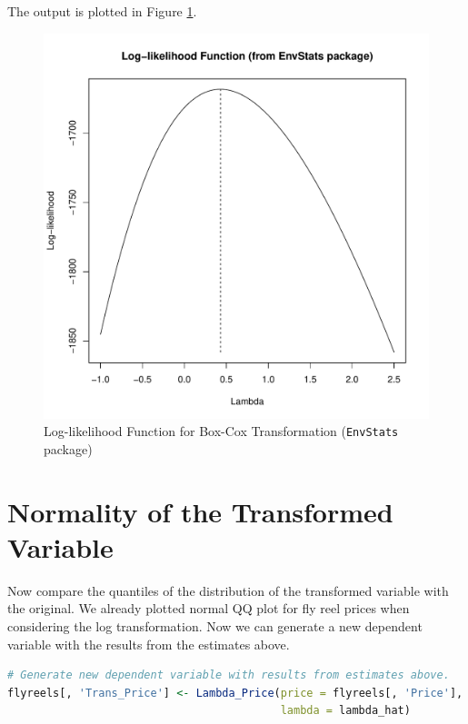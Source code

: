 \documentclass[11pt]{book}
\begin{document}
The output is plotted in Figure \ref{fig:plot_like_EnvStats}.

\begin{figure}[h!]
  \centering
  \includegraphics[scale = 0.5, keepaspectratio=true]{../Figures/plot_like_EnvStats}
  \caption{Log-likelihood Function for Box-Cox Transformation (\texttt{EnvStats} package)} \label{fig:plot_like_EnvStats}
\end{figure}






\clearpage
\section*{Normality of the Transformed Variable}

Now compare the quantiles of the distribution of the transformed variable with 
the original. 
We already plotted normal QQ plot for fly reel prices when considering the log transformation.
Now we can generate a new dependent variable with the results from the estimates above.


\begin{lstlisting}[language=R]
# Generate new dependent variable with results from estimates above.
flyreels[, 'Trans_Price'] <- Lambda_Price(price = flyreels[, 'Price'],
                                          lambda = lambda_hat)
\end{lstlisting}
\end{document}
